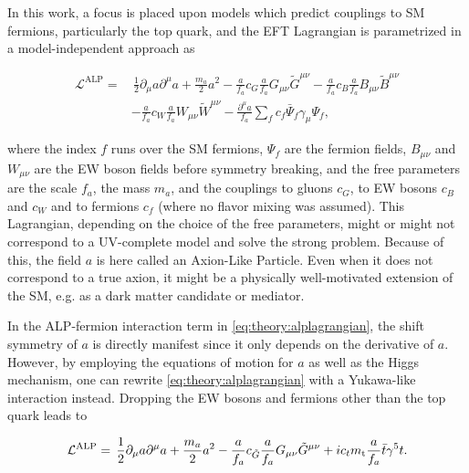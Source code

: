 In this work, a focus is placed upon models which predict couplings to SM fermions, particularly the top quark, and the EFT Lagrangian is parametrized in a model-independent approach as~\cite{Georgi:1986df}

\begin{equation}
\begin{split}
\label{eq:theory:alplagrangian}
    \mathcal{L}^{\mathrm{ALP}} =& \, \frac{1}{2} \partial_\mu a \partial^\mu a
    + \frac{m_a}{2} a^2
    - \frac{a}{f_a} c_G \frac{a}{f_a} G_{\mu \nu} \tilde{G}^{\mu \nu}
    - \frac{a}{f_a} c_B \frac{a}{f_a} B_{\mu \nu} \tilde{B}^{\mu \nu} \\
    & - \frac{a}{f_a} c_W \frac{a}{f_a} W_{\mu \nu} \tilde{W}^{\mu \nu}
    - \frac{\partial^\mu a}{f_a} \sum_f c_f \bar{\Psi}_f \gamma_\mu \Psi_f ,
\end{split}
\end{equation}

\noindent where the index $f$ runs over the SM fermions, $\Psi_f$ are the fermion fields, $B_{\mu \nu}$ and $W_{\mu \nu}$ are the EW boson fields before symmetry breaking, and the free parameters are the scale $f_a$, the mass $m_a$, and the couplings to gluons $c_G$, to EW bosons $c_B$ and $c_W$ and to fermions $c_f$ (where no flavor mixing was assumed). This Lagrangian, depending on the choice of the free parameters, might or might not correspond to a UV-complete model and solve the strong \CP problem. Because of this, the field $a$ is here called an Axion-Like Particle. Even when it does not correspond to a true axion, it might be a physically well-motivated extension of the SM, e.g. as a dark matter candidate or mediator.

In the ALP-fermion interaction term in \cref{eq:theory:alplagrangian}, the shift symmetry of $a$ is directly manifest since it only depends on the derivative of $a$. However, by employing the equations of motion for $a$ as well as the Higgs mechanism, one can rewrite \cref{eq:theory:alplagrangian} with a Yukawa-like interaction instead. Dropping the EW bosons and fermions other than the top quark leads to

\begin{equation}
\label{eq:theory:alplagrangian2}
    \mathcal{L}^{\mathrm{ALP}} = \, \frac{1}{2} \partial_\mu a \partial^\mu a
    + \frac{m_a}{2} a^2
    - \frac{a}{f_a} c_{\tilde{G}} \frac{a}{f_a} G_{\mu \nu} \tilde{G}^{\mu \nu}
    + i c_t m_{\mathrm{t}} \frac{a}{f_a} \bar{t} \gamma^5 t .
\end{equation}

